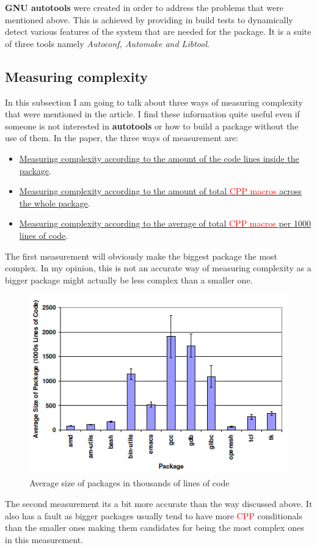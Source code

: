 \documentclass[11pt]{article}
\begin{document}
\textbf{GNU autotools} were created in order to address the problems that were mentioned above. This is achieved by providing in build tests to dynamically detect various features of the system that are needed for the package. It is a suite of three tools namely \textit{Autoconf, Automake and Libtool}.

\subsection{Measuring complexity}
In this subsection I am going to talk about three ways of measuring complexity that were mentioned in the article. I find these information quite useful even if someone is not interested in \textbf{autotools} or how to build a package without the use of them. In the paper, the three ways of measurement are:
\begin{itemize}
\item \underline{Measuring complexity according to the amount of the code lines inside the package}.
\item \underline{Measuring complexity according to the amount of total \textcolor{red}{CPP macros} across the whole package}.
\item \underline{Measuring complexity according to the average of total \textcolor{red}{CPP macros} per 1000 lines of code}.
\end{itemize}

The first measurement will obviously make the biggest package the most complex. In my opinion, this is not an accurate way of measuring complexity as a bigger package might actually be less complex than a smaller one.

\begin{figure}[!htb]
\centering
  \includegraphics[width=.7\linewidth]{images/measure1}
  \caption{Average size of packages in thousands of lines of
code \cite{zadok2002}}
  \label{fig:measure1}
\end{figure}
\FloatBarrier
The second measurement its a bit more accurate than the way discussed above. It also has a fault as bigger packages usually tend to have more \textcolor{red}{CPP} conditionals than the smaller ones making them candidates for being the most complex ones in this measurement.
\end{document}
